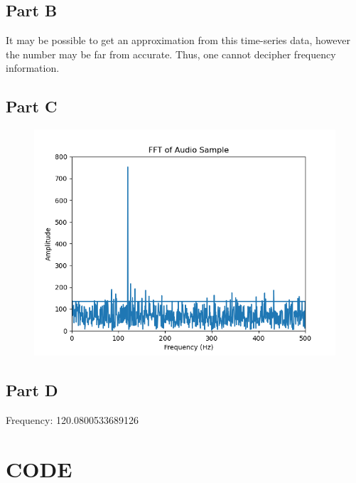 \documentclass[]{report}
\begin{document}
\subsection{Part B}

\begin{center}
	It may be possible to get an approximation from this time-series data, however the number may be far from accurate. Thus, one cannot decipher frequency information.
\end{center}

\subsection{Part C}

\begin{figure}[H]
	\centering
	\includegraphics[width=0.7\linewidth]{../results/p3_fft}
\end{figure}


\subsection{Part D}

\begin{center}
	Frequency: 120.0800533689126
\end{center}




\newpage



\section{CODE}
\end{document}
